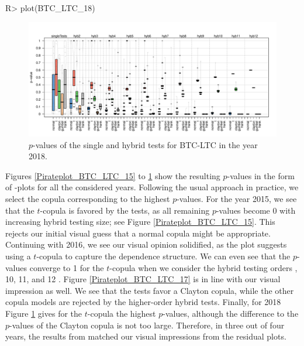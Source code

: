 \vspace{0.5cm}
\begin{example}
R> plot(BTC_LTC_18)
\end{example}
\vspace{-1cm}
\begin{figure}[H]
	\centering
 \includegraphics[width=\textwidth]{img/BTC_LTC_18.pdf}
	\caption{$p$-values of the single and hybrid tests for BTC-LTC in the year 2018.}
	\label{Pirateplot_BTC_LTC_18}
\end{figure}

Figures \ref{Pirateplot_BTC_LTC_15} to \ref{Pirateplot_BTC_LTC_18} show the resulting $p$-values in the form of -plots for all the considered years. Following the usual approach in practice, we select the copula corresponding to the highest $p$-values. For the year 2015, we see that the $t$-copula is favored by the tests, as all remaining $p$-values become 0 with increasing hybrid testing size; \mycolor see Figure \ref{Pirateplot_BTC_LTC_15}. \bk This rejects our initial visual guess that a normal copula might be appropriate. Continuing with 2016, we see our visual opinion solidified, as the plot suggests using a $t$-copula to capture the dependence structure. We can even see that the $p$-values converge to 1 for the $t$-copula when we consider the hybrid testing orders , 10, 11, and 12 \bk. Figure \ref{Pirateplot_BTC_LTC_17} is in line with our visual impression as well. We see that the tests favor a Clayton copula, while the other copula models are rejected by the higher-order hybrid tests. Finally, for 2018 Figure \ref{Pirateplot_BTC_LTC_18} gives for the $t$-copula the highest $p$-values, although the difference to the $p$-values of the Clayton copula is not too large. Therefore, in three out of four years, the results from  matched our visual impressions from the residual plots.

